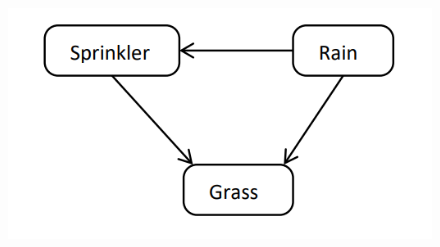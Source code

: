 \documentclass[10pt,a4paper]{article}
\begin{document}
\begin{enumerate}
		\begin{figure}[h!]
			\centering
			\includegraphics{nb}
		\end{figure}
		
	\end{enumerate}
	
\end{document}

